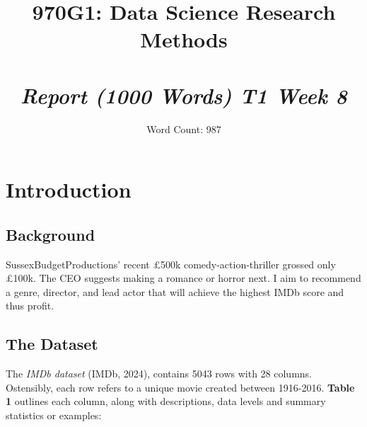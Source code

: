\documentclass[11pt]{article}
\title{%
\Huge \textbf{970G1: Data Science Research Methods} \\ 
\small \ \\ 
\huge \textit{Report (1000 Words) T1 Week 8}
}
\author{Word Count: 987}
\date{}
\begin{document}
\maketitle
\pagebreak

\tableofcontents
\pagebreak


\pagebreak
\section{Introduction}

\subsection{Background}

SussexBudgetProductions’ recent £500k comedy-action-thriller grossed only £100k. The CEO suggests making a romance or horror next. I aim to recommend a genre, director, and lead actor that will achieve the highest IMDb score and thus profit.

\subsection{The Dataset}

The \emph{IMDb dataset} (IMDb, 2024), contains 5043 rows with 28 columns. Ostensibly, each row refers to a unique movie created between 1916-2016. \textbf{Table 1} outlines each column, along with descriptions, data levels and summary statistics or examples:
\end{document}
